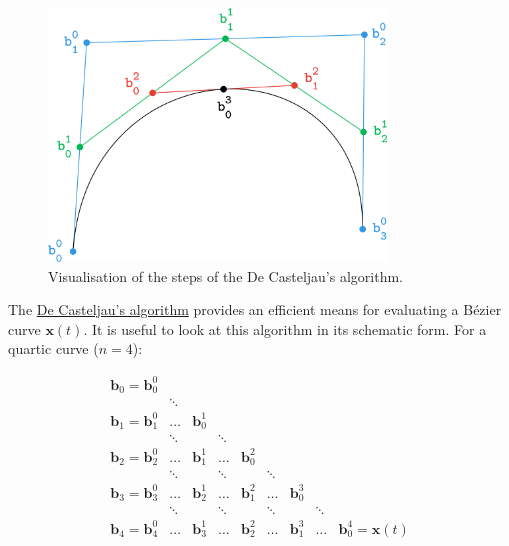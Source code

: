 \documentclass{article}
\begin{document}
\begin{figure}[htb]
\centering
\includegraphics[width=0.8\textwidth]{../assets/geo-num-2016/casteljau-curve.png}
\caption{Visualisation of the steps of the De Casteljau's algorithm.}
\end{figure}

The \href{https://en.wikipedia.org/wiki/De_Casteljau\%27s_algorithm}{De
Casteljau's algorithm} provides an efficient means for evaluating a
Bézier curve \(\mathbf{x}(t)\).
It is useful to look at this algorithm in its schematic form.
For a quartic curve (\(n=4\)):

\[
\begin{array}{ccccccccc}
\mathbf b_0 = \mathbf b_0^0 &        &               &        &               &        &               &        & \\
                            & \ddots &               &        &               &        &               &        & \\
\mathbf b_1 = \mathbf b_1^0 & \dots  & \mathbf b_0^1 &        &               &        &               &        & \\
                            & \ddots &               & \ddots &               &        &               &        & \\
\mathbf b_2 = \mathbf b_2^0 & \dots  & \mathbf b_1^1 & \dots  & \mathbf b_0^2 &        &               &        & \\
                            & \ddots &               & \ddots &               & \ddots &               &        & \\
\mathbf b_3 = \mathbf b_3^0 & \dots  & \mathbf b_2^1 & \dots  & \mathbf b_1^2 & \dots  & \mathbf b_0^3 &        & \\
                            & \ddots &               & \ddots &               & \ddots &               & \ddots & \\
\mathbf b_4 = \mathbf b_4^0 & \dots  & \mathbf b_3^1 & \dots  & \mathbf b_2^2 & \dots  & \mathbf b_1^3 & \dots  & \mathbf b_0^4 = \mathbf x(t) 
\end{array}
\]
\end{document}

